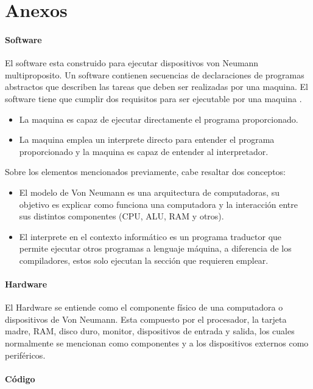 \chapter{Anexos}

\subsubsection{Software}

El software esta construido para ejecutar dispositivos von Neumann multiproposito. Un software contienen secuencias de declaraciones de programas abstractos que describen las tareas que deben ser realizadas por una maquina. El software tiene que cumplir dos requisitos para ser ejecutable por una maquina \cite{councill2001definition}.
\begin{itemize}
	\item La maquina es capaz de ejecutar directamente el programa proporcionado.
	\item La maquina emplea un interprete directo para entender el programa proporcionado y la maquina es capaz de entender al interpretador.
\end{itemize}

Sobre los elementos mencionados previamente, cabe resaltar dos conceptos:
\begin{itemize}
	\item El modelo de Von Neumann es una arquitectura de computadoras, su objetivo es explicar como funciona una computadora y la interacción entre sus distintos componentes (CPU, ALU, RAM y otros).
	\item El interprete en el contexto informático es un programa traductor que permite ejecutar otros programas a lenguaje máquina, a diferencia de los compiladores, estos solo ejecutan la sección que requieren emplear.
\end{itemize}

\subsubsection{Hardware}

El Hardware se entiende como el componente físico de una computadora o dispositivos de Von Neumann. Esta compuesto por el procesador, la tarjeta madre, RAM, disco duro, monitor, dispositivos de entrada y salida, los cuales normalmente se mencionan como componentes y a los dispositivos externos como periféricos\cite{hardwaredef}.
\subsubsection{Código}

